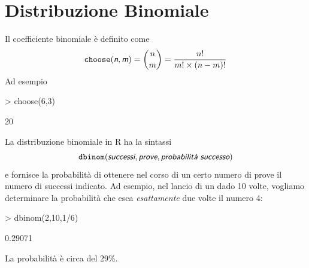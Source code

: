 \documentclass[onecolumn,12pt]{book}
\newcommand{\varia}[1]{\textsl{\textsf{#1}}}
\begin{document}
\section{Distribuzione Binomiale}
Il coefficiente binomiale \`e definito come
\begin{equation*} \texttt{choose}(\varia{n},\varia{m})={n \choose m}=\dfrac{n!}{m!\times (n-m)!}\end{equation*}
Ad esempio
\begin{Schunk}
\begin{Sinput}
> choose(6,3)
\end{Sinput}
\begin{Soutput}
[1] 20
\end{Soutput}
\end{Schunk}
La distribuzione binomiale in \textsf{R} ha la sintassi $$\texttt{dbinom}(\varia{successi},\varia{prove},
\varia{probabilit\`a successo})$$ e fornisce la  probabilit\`a di ottenere nel corso di un certo numero di prove  il numero di successi indicato.
Ad esempio, nel lancio di un dado 10 volte, vogliamo determinare la  probabilit\`a che esca  \emph{esattamente} due volte il numero 4:
\begin{Schunk}
\begin{Sinput}
> dbinom(2,10,1/6)
\end{Sinput}
\begin{Soutput}
[1] 0.29071
\end{Soutput}
\end{Schunk}

La  probabilit\`a \`e circa del 29\%.
\end{document}
